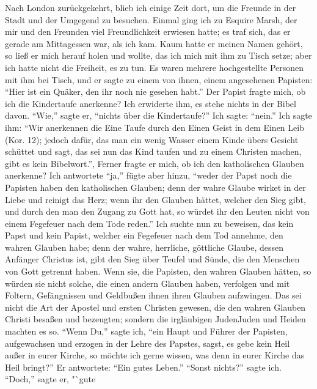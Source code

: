 Nach London zurückgekehrt, blieb ich einige Zeit dort, um die
Freunde in der Stadt und der Umgegend zu besuchen. Einmal
ging ich zu Esquire Marsh, der mir und den Freunden viel
Freundlichkeit erwiesen hatte; es traf sich, das er gerade am
Mittagessen war, als ich kam. Kaum hatte er meinen Namen
gehört, so ließ er mich herauf holen und wollte, das ich mich mit
ihm zu Tisch setze; aber ich hatte nicht die Freiheit, es zu tun.
Es waren mehrere hochgestellte Personen mit ihm bei Tisch, und
er sagte zu einem von ihnen, einem angesehenen Papisten: "`Hier
ist ein Quäker, den ihr noch nie gesehen habt."' Der Papist fragte
mich, ob ich die Kindertaufe anerkenne? Ich erwiderte ihm, es
stehe nichts in der Bibel davon. "`Wie,"' sagte er, "`nichts über
die Kindertaufe?"' Ich sagte: "`nein."' Ich sagte ihm: "`Wir
anerkennen die Eine Taufe durch den Einen Geist in dem Einen
Leib (Kor. 12); jedoch dafür, das man ein wenig Wasser einem
Kinde übers Gesicht schüttet und sagt, das sei nun das Kind taufen
und zu einem Christen machen, gibt es kein Bibelwort."', Ferner
fragte er mich, ob ich den katholischen Glauben anerkenne? Ich
antwortete "`ja,"' fügte aber hinzu, "`weder der Papst noch die
Papisten haben den katholischen Glauben; denn der wahre Glaube
wirket in der Liebe und reinigt das Herz; wenn ihr den Glauben
hättet, welcher den Sieg gibt, und durch den man den Zugang
zu Gott hat, so würdet ihr den Leuten nicht von einem Fegefeuer
nach dem Tode reden."' Ich suchte 
nun zu beweisen, das kein Papst und kein Papist, welcher ein 
Fegefeuer nach dem Tod
annehme, den wahren Glauben habe; denn der wahre, herrliche,
göttliche Glaube, dessen Anfänger Christus ist, gibt den Sieg über
Teufel und Sünde, die den Menschen von Gott getrennt haben.
Wenn sie, die Papisten, den wahren Glauben hätten, so würden
sie nicht solche, die einen andern Glauben haben, verfolgen und
mit Foltern, Gefängnissen und Geldbußen ihnen ihren Glauben
aufzwingen. Das sei nicht die Art der Apostel und ersten Christen
gewesen, die den wahren Glauben Christi besaßen und bezeugten;
sondern die irgläubigen Juden\indexname{Juden} und Heiden machten es so. "`Wenn
Du,"' sagte ich, "`ein Haupt und Führer der Papisten, 
aufgewachsen und erzogen in der Lehre des Papstes, sagst, es gebe kein
Heil außer in eurer Kirche, so möchte ich gerne wissen, was denn
in eurer Kirche das Heil bringt?"' Er antwortete: "`Ein gutes
Leben."' "`Sonst nichts?"' sagte ich. "`Doch,"' sagte er, "`gute
